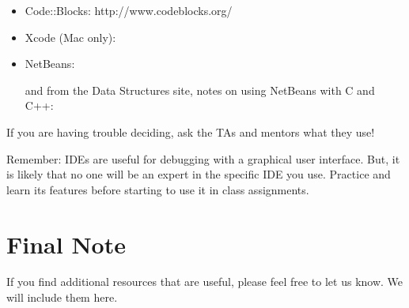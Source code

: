 \documentclass[letterpaper,10pt,english]{sphinxmanual}
\begin{document}
\begin{itemize}
\begin{itemize}
\item {} 
Code::Blocks: http://www.codeblocks.org/

\item {} 
Xcode (Mac only): 

\item {} 
NetBeans: 

and from the Data Structures site, notes on using NetBeans with C and C++:


\end{itemize}

\end{itemize}

If you are having trouble deciding, ask the TAs and mentors what they use!

Remember: IDEs are useful for debugging with a graphical user
interface. But, it is likely that no one will be an expert in the
specific IDE you use. Practice and learn its features before starting
to use it in class assignments.


\section{Final Note}
\label{\detokenize{lecture_notes/setting_up_for_ds:final-note}}
If you find additional resources that are useful, please feel free to
let us know. We will include them here.



\renewcommand{\indexname}{Index}
\printindex
\end{document}
